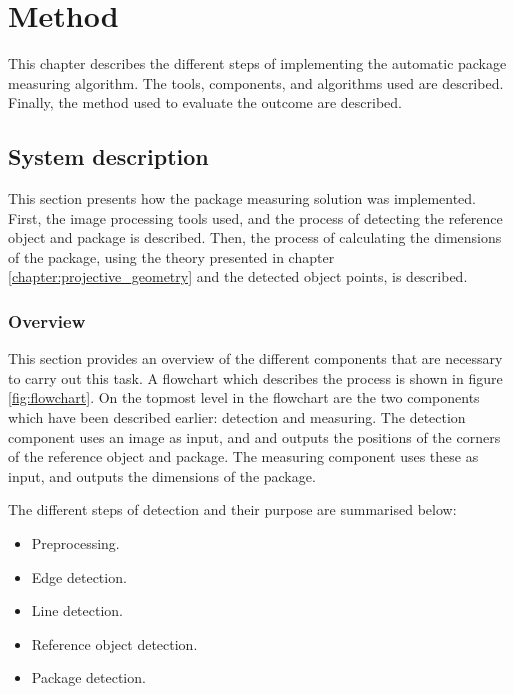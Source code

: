 \chapter{Method}
%

This chapter describes the different steps of implementing the automatic package measuring algorithm.
The tools, components, and algorithms used are described.
Finally, the method used to evaluate the outcome are described.

\section{System description} \label{method:implementation}
This section presents how the package measuring solution was implemented.
First, the image processing tools used, and the process of detecting the reference object and package is described.
Then, the process of calculating the dimensions of the package, using the theory presented in chapter \ref{chapter:projective_geometry} and the detected object points, is described.

\subsection{Overview}
This section provides an overview of the different components that are necessary to carry out this task. A flowchart which describes the process is shown in figure \ref{fig:flowchart}.
On the topmost level in the flowchart are the two components which have been described earlier: detection and measuring. 
The detection component uses an image as input, and and outputs the positions of the corners of the reference object and package.
The measuring component uses these as input, and outputs the dimensions of the package.

The different steps of detection and their purpose are summarised below: %
\begin{itemize}
	\item Preprocessing. 
	\item Edge detection.
	\item Line detection.
	\item Reference object detection.
	\item Package detection.
\end{itemize}

